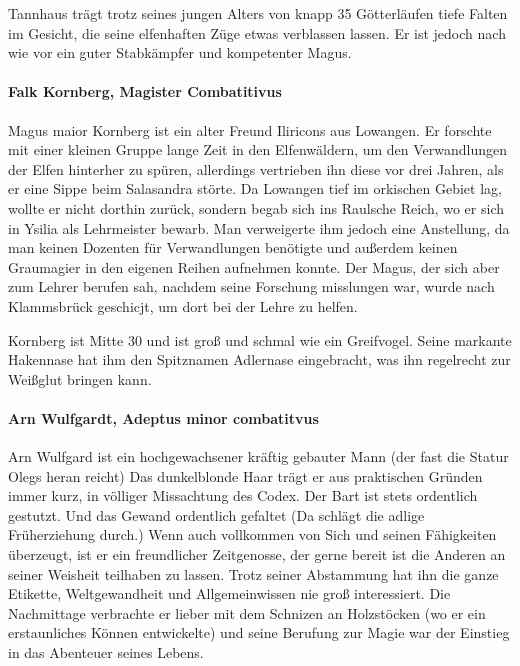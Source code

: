 Tannhaus trägt trotz seines jungen Alters von knapp 35 Götterläufen tiefe Falten im Gesicht, die seine elfenhaften Züge etwas verblassen lassen. Er ist jedoch nach wie vor ein guter Stabkämpfer und kompetenter Magus.

\paragraph{Falk Kornberg, Magister Combatitivus}
Magus maior Kornberg ist ein alter Freund Iliricons aus Lowangen. Er forschte mit einer kleinen Gruppe lange Zeit in den Elfenwäldern, um den Verwandlungen der Elfen hinterher zu spüren, allerdings vertrieben ihn diese vor drei Jahren, als er eine Sippe beim Salasandra störte. Da Lowangen tief im orkischen Gebiet lag, wollte er nicht dorthin zurück, sondern begab sich ins Raulsche Reich, wo er sich in Ysilia als Lehrmeister bewarb. Man verweigerte ihm jedoch eine Anstellung, da man keinen Dozenten für Verwandlungen benötigte und außerdem keinen Graumagier in den eigenen Reihen aufnehmen konnte. Der Magus, der sich aber zum Lehrer berufen sah, nachdem seine Forschung misslungen war, wurde nach Klammsbrück geschicjt, um dort bei der Lehre zu helfen.

Kornberg ist Mitte 30 und ist groß und schmal wie ein Greifvogel. Seine markante Hakennase hat ihm den Spitznamen Adlernase eingebracht, was ihn regelrecht zur Weißglut bringen kann.

\paragraph{Arn Wulfgardt, Adeptus minor combatitvus}
Arn Wulfgard ist ein hochgewachsener kräftig gebauter Mann (der fast die Statur Olegs heran reicht)
Das dunkelblonde Haar trägt er aus praktischen Gründen immer kurz, in völliger Missachtung des Codex. Der Bart ist stets ordentlich gestutzt. Und das Gewand ordentlich gefaltet (Da schlägt die adlige Früherziehung durch.)
Wenn auch vollkommen von Sich und seinen Fähigkeiten überzeugt, ist er ein freundlicher Zeitgenosse, der gerne bereit ist die Anderen an seiner Weisheit teilhaben zu lassen.
Trotz seiner Abstammung hat ihn die ganze Etikette, Weltgewandheit und Allgemeinwissen nie groß interessiert. Die Nachmittage verbrachte er lieber mit dem Schnizen an Holzstöcken (wo er ein erstaunliches Können entwickelte) und seine Berufung zur Magie war der Einstieg in das Abenteuer seines Lebens.

